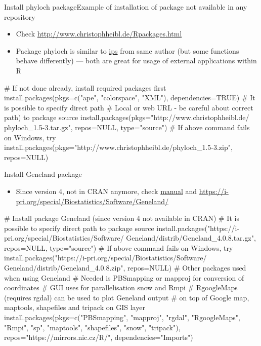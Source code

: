 \documentclass[compress, ucs, xelatex, 11pt, xcolor=svgnames,
	hyperref={
		bookmarks=true,
		unicode=true,
		colorlinks=true,
		pdftitle={Molecular data in R},
		plainpages=false,
		pdfauthor={Vojtech Zeisek},
		pdfsubject={Course about phylogeny and evolution in R},
		pdfcreator={XeLaTeX},
		pdfkeywords={R, evolution, phylogeny, molecular data},
		linkcolor=Tomato,
		anchorcolor=SaddleBrown,
		citecolor=Goldenrod,
		filecolor=DarkMagenta,
		menucolor=Sienna,
		urlcolor=DarkTurquoise,
		pdftex},
	url={hyphens, lowtilde} %
	]{beamer}
\begin{document}
\begin{frame}[fragile]{Install phyloch package}{Example of installation of package not available in any repository}
	\label{phyloch}
	\begin{itemize}
		\item Check \url{http://www.christophheibl.de/Rpackages.html}
		\item Package phyloch is similar to \href{https://CRAN.R-project.org/package=ips}{ips} from same author (but some functions behave differently) --- both are great for usage of external applications within R
	\end{itemize}
	\begin{spluscode}
    # If not done already, install required packages first
    install.packages(pkgs=c("ape", "colorspace", "XML"),
      dependencies=TRUE)
    # It is possible to specify direct path
    # Local or web URL - be careful about correct path) to package source
    install.packages(pkgs="http://www.christophheibl.de/
      phyloch_1.5-3.tar.gz", repos=NULL, type="source")
    # If above command fails on Windows, try
    install.packages(pkgs="http://www.christophheibl.de/phyloch_1.5-3.zip",
      repos=NULL)
	\end{spluscode}
\end{frame}

\begin{frame}[fragile]{Install Geneland package}
	\label{Geneland}
	\begin{itemize}
		\item Since version 4, not in CRAN anymore, check \href{https://i-pri.org/special/Biostatistics/Software/Geneland/Geneland-Doc.pdf}{manual} and \url{https://i-pri.org/special/Biostatistics/Software/Geneland/}
	\end{itemize}
	\begin{spluscode}
    # Install package Geneland (since version 4 not available in CRAN)
    # It is possible to specify direct path to package source
    install.packages("https://i-pri.org/special/Biostatistics/Software/
      Geneland/distrib/Geneland_4.0.8.tar.gz", repos=NULL, type="source")
    # If above command fails on Windows, try
    install.packages("https://i-pri.org/special/Biostatistics/Software/
      Geneland/distrib/Geneland_4.0.8.zip", repos=NULL)
    # Other packages used when using Geneland
    # Needed is PBSmapping or mapproj for conversion of coordinates
    # GUI uses for parallelisation snow and Rmpi
    # RgoogleMaps (requires rgdal) can be used to plot Geneland output
    # on top of Google map, maptools, shapefiles and tripack on GIS layer
    install.packages(pkgs=c("PBSmapping", "mapproj", "rgdal", "RgoogleMaps",
      "Rmpi", "sp", "maptools", "shapefiles", "snow", "tripack"),
      repos="https://mirrors.nic.cz/R/", dependencies="Imports")
	\end{spluscode}
\end{frame}
\end{document}
